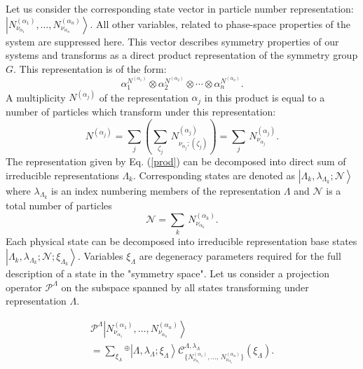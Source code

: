 \documentclass[a4paper]{article}
\begin{document}
Let us consider the corresponding state vector in particle number
representation: $\left\vert N^{(\alpha_1)}_{\nu_{\alpha_1}},\dots,
N^{(\alpha_n)}_{\nu_{\alpha_n}}\right\rangle .$ All other
variables, related to phase-space properties of the system are
suppressed here. This vector describes symmetry properties of our
systems and transforms as a direct product representation of the
symmetry group $G$. This representation is of the form:
\begin{equation}\label{prod}
\alpha_1^{N^{(\alpha_1)}} \otimes \alpha_2^{N^{(\alpha_2)}}
\otimes \cdots \otimes \alpha_n^{N^{(\alpha_n)}}.
\end{equation}
A multiplicity $N^{(\alpha_j)}$ of the representation $\alpha_j$
in this product is equal to a number of particles which transform
under this representation:
\begin{equation}
N^{(\alpha_j)} = \sum_j\left(\sum_{\zeta_j}\,
N^{(\alpha_j)}_{\nu_{\alpha_j};(\zeta_j)}\right)= \sum_j\,
N^{(\alpha_j)}_{\nu_{\alpha_j}} .
 \label{pnumber}
\end{equation}
The representation given by Eq. (\ref{prod}) can be decomposed
into direct sum of irreducible representations $\Lambda_k$.
Corresponding states are denoted as $\left\vert \Lambda_k,
\lambda_{\Lambda_k}; {\mathcal N}\right\rangle$ where
$\lambda_{\Lambda_k}$ is an index numbering members of the
representation $\Lambda$ and ${\mathcal N}$ is a total number of
particles
\begin{equation}
{\mathcal N}=\sum_k\,
N^{(\alpha_k)}_{\nu_{\alpha_k}}.
\label{number}
\end{equation}
Each physical state can be decomposed into irreducible
representation base states $ \left\vert \Lambda_k,
\lambda_{\Lambda_k}; {{\mathcal N};\xi_{\Lambda_k}}\right\rangle
$. Variables $\xi_{\Lambda}$ are degeneracy parameters required
for the full description of a state in the "symmetry space". Let
us consider a projection operator ${\mathcal P}^{\Lambda}$ on the
subspace spanned by all states transforming under representation
$\Lambda$.

\begin{eqnarray}
{\mathcal P}^{\Lambda}\left\vert
N^{(\alpha_1)}_{\nu_{\alpha_1}},\dots,
N^{(\alpha_n)}_{\nu_{\alpha_n}}\right\rangle\nonumber\\[4pt] =
\sum_{\xi_{\Lambda}}\!^{\oplus} \left\vert \Lambda,
\lambda_{\Lambda};\xi_\Lambda\right\rangle{\mathcal
C}^{\Lambda,\lambda_{\Lambda}}_{\{N^{(\alpha_1)}_{\nu_{\alpha_1}},
\dots,\,N^{(\alpha_n)}_{\nu_{\alpha_n}}\}}(\xi_\Lambda).
\label{proj1states}
\end{eqnarray}
\end{document}
